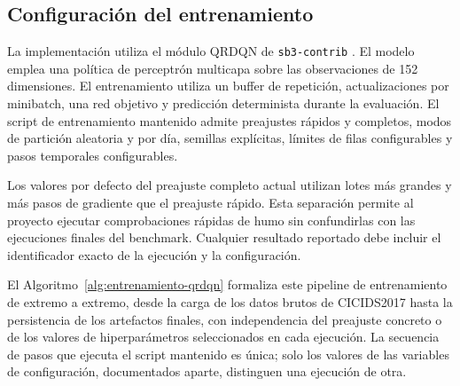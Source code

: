 \subsection{Configuración del entrenamiento}
La implementación utiliza el módulo QRDQN de \texttt{sb3-contrib} \parencite{SB3ContribQRDQNDocs}. El modelo emplea una política de perceptrón multicapa sobre las observaciones de 152 dimensiones. El entrenamiento utiliza un buffer de repetición, actualizaciones por minibatch, una red objetivo y predicción determinista durante la evaluación. El script de entrenamiento mantenido admite preajustes rápidos y completos, modos de partición aleatoria y por día, semillas explícitas, límites de filas configurables y pasos temporales configurables.

Los valores por defecto del preajuste completo actual utilizan lotes más grandes y más pasos de gradiente que el preajuste rápido. Esta separación permite al proyecto ejecutar comprobaciones rápidas de humo sin confundirlas con las ejecuciones finales del benchmark. Cualquier resultado reportado debe incluir el identificador exacto de la ejecución y la configuración.

El Algoritmo~\ref{alg:entrenamiento-qrdqn} formaliza este pipeline de entrenamiento de extremo a extremo, desde la carga de los datos brutos de CICIDS2017 hasta la persistencia de los artefactos finales, con independencia del preajuste concreto o de los valores de hiperparámetros seleccionados en cada ejecución. La secuencia de pasos que ejecuta el script mantenido es única; solo los valores de las variables de configuración, documentados aparte, distinguen una ejecución de otra.

